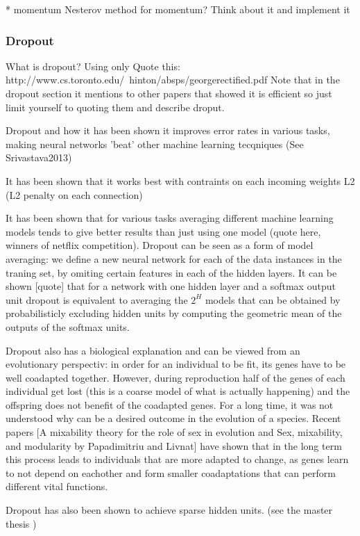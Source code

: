 \documentclass[11pt, fleqn, twoside]{article}
\begin{document}
  * momentum
    Nesterov method for momentum? Think about it and implement it


\subsubsection{Dropout}

  What is dropout? Using only
  Quote this:
  http://www.cs.toronto.edu/~hinton/absps/georgerectified.pdf
  Note that in the dropout section it mentions to other papers that showed it is efficient so
  just limit yourself to quoting them and describe droput.

  Dropout and how it has been shown it improves error rates in  various tasks, making neural networks 'beat' other machine learning tecqniques (See
  Srivastava2013)

  It has been shown that it works best with contraints on each incoming weights L2 (L2 penalty on each connection)

  It has been shown that for various tasks averaging different machine learning models tends to give better results than just using one model (quote here, winners of netflix competition). Dropout can be seen as a form of model averaging:
  we define a new neural network for each of the data instances in the traning set, by omiting certain features in each of the hidden layers.
  It can be shown [quote] that for a network with one hidden layer and a softmax output unit dropout is equivalent to averaging the $2^H$ models that can be obtained by probabilisticly excluding hidden units by computing the geometric mean of the outputs of the softmax units.

  Dropout also has a biological explanation and can be viewed from an evolutionary perspectiv: in order for an individual to be fit, its genes have to be well coadapted together. However, during reproduction half of the genes of each individual get lost (this is a coarse model of what is actually happening) and the offspring does not benefit of the coadapted genes. For a long time, it was not understood why can be a desired outcome in the evolution of a species. Recent papers [A mixability theory for the role of sex in evolution
  and Sex, mixability, and modularity by Papadimitriu and Livnat] have shown that in the long term this process leads to individuals that are more adapted to change, as genes learn to not depend on eachother and form smaller coadaptations that can perform different vital functions.

  Dropout has also been shown to achieve sparse hidden units. (see the master thesis )
\end{document}
